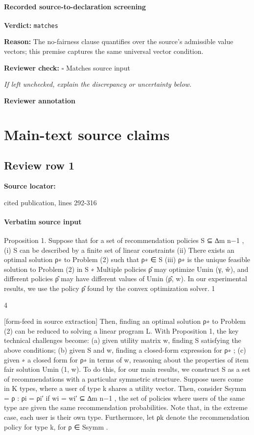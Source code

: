 \documentclass[10pt]{article}
\newcommand{\reviewerbox}{%
  \par\noindent\fbox{\parbox{0.96\linewidth}{\rule{0pt}{0.38in}}}\par
}
\newcommand{\reviewmatch}[1]{%
  \par\noindent\textbf{Reviewer check:} $\square$\; #1\par
  \noindent\emph{If left unchecked, explain the discrepancy or uncertainty below.}\par
}
\begin{document}
\paragraph{Recorded source-to-declaration screening}
\textbf{Verdict:} \texttt{matches}
\\
{\raggedright
\textbf{Reason:} The no-\allowbreak{}fairness clause quantifies over the source's admissible value vectors;\allowbreak{} this premise captures the same universal vector condition.\allowbreak{}
\par}
\reviewmatch{Matches source input}
\noindent\textbf{Reviewer annotation}\par
\reviewerbox

\clearpage
\hypertarget{source-claim-2d18213881f27a07}{}
\hypertarget{source-section-0c7af8265958a9ea}{}
\section*{Main-text source claims}
\subsection*{Review row 1}
\textbf{Source locator:} {\footnotesize\raggedright cited publication, lines 292-\allowbreak{}316\par}
\paragraph{Verbatim source input}
\begin{ReviewVerbatim}
Proposition 1. Suppose that for a set of recommendation policies S ⊆ ∆m
n−1 ,
(i) S can be described by a finite set of linear constraints
(ii) There exists an optimal solution ρ∗ to Problem (2) such that ρ∗ ∈ S
(iii) ρ∗ is the unique feasible solution to Problem (2) in S
∗
Multiple policies ρ̂ may optimize Umin
(γ, ŵ), and different policies ρ̂ may have different values of
Umin (ρ̂, w). In our experimental results, we use the policy ρ̂ found by the convex optimization solver.
1

4


[form-feed in source extraction]
Then, finding an optimal solution ρ∗ to Problem (2) can be reduced to solving a linear program L.
With Proposition 1, the key technical challenges become: (a) given utility matrix w, finding S
satisfying the above conditions; (b) given S and w, finding a closed-form expression for ρ∗ ; (c) given
∗
a closed form for ρ∗ in terms of w, reasoning about the properties of item fair solution Umin
(1, w).
To do this, for our main results, we construct S as a set of recommendations with a particular
symmetric structure. Suppose users come in K types, where a user of type k shares a utility vector.
Then, consider Ssymm = {ρ : ρi = ρi′ if wi = wi′ } ⊆ ∆m
n−1 , the set of policies where users of the
same type are given the same recommendation probabilities. Note that, in the extreme case, each user
is their own type. Furthermore, let ρk denote the recommendation policy for type k, for ρ ∈ Ssymm .
\end{ReviewVerbatim}
\end{document}
